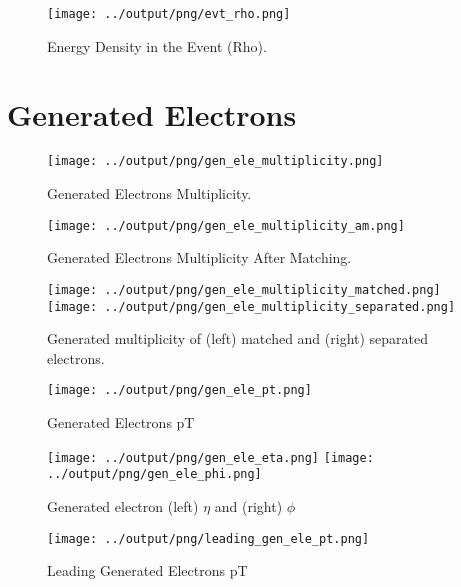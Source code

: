 \documentclass[11pt]{book}
\begin{document}
\begin{figure}[htb]
\centering
\texttt{[image: ../output/png/evt\_rho.png]}
\caption{Energy Density in the Event (Rho).}
\label{fig:rho}
\end{figure}



\section{Generated Electrons}

\begin{figure}[htb]
\centering
\texttt{[image: ../output/png/gen\_ele\_multiplicity.png]}
\caption{Generated Electrons Multiplicity.}
\label{fig:gen_ele_multiplicity}
\end{figure}

\begin{figure}[htb]
\centering
\texttt{[image: ../output/png/gen\_ele\_multiplicity\_am.png]}
\caption{Generated Electrons Multiplicity After Matching.}
\label{fig:gen_ele_multiplicity_am}
\end{figure}


\begin{figure}[htb]
\centering
\texttt{[image: ../output/png/gen\_ele\_multiplicity\_matched.png]}
\texttt{[image: ../output/png/gen\_ele\_multiplicity\_separated.png]}
\caption{Generated multiplicity of (left) matched and (right) separated electrons.}
\label{fig:gn_ele_mat_sep}
\end{figure}

\begin{figure}[htb]
\centering
\texttt{[image: ../output/png/gen\_ele\_pt.png]}
\caption{Generated Electrons pT}
\label{fig:gen_ele_pt}
\end{figure}
\clearpage

\begin{figure}[htb]
\centering
\texttt{[image: ../output/png/gen\_ele\_eta.png]}
\texttt{[image: ../output/png/gen\_ele\_phi.png]}
\caption{Generated electron (left) $\eta$ and (right) $\phi$}
\label{fig:gen_ele_eta_phi}
\end{figure}

\begin{figure}[htb]
\centering
\texttt{[image: ../output/png/leading\_gen\_ele\_pt.png]}
\caption{Leading Generated Electrons pT}
\label{fig:leading_gen_ele_pt}
\end{figure}
\end{document}
